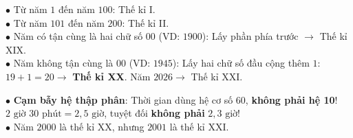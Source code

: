 \documentclass[14pt,a4paper,oneside]{extbook}
\begin{document}
\noindent
\begin{minipage}[t]{0.54\textwidth}
  \begin{tcolorbox}[
    enhanced,
    title={\footnotesize\bfseries\color{white}\faHistory\ Cách xác định năm thuộc thế kỉ nào},
    colback=green!3!white,
    colframe=green!60!black,
    arc=2.5mm, boxrule=0.8pt, top=1.8mm, bottom=1.8mm, left=2.2mm, right=2.2mm
  ]
    \footnotesize
    $\bullet$ Từ năm $1$ đến năm $100$: Thế kỉ I.\\
    $\bullet$ Từ năm $101$ đến năm $200$: Thế kỉ II.\\
    $\bullet$ Năm có tận cùng là hai chữ số $00$ (VD: $1900$): Lấy phần phía trước $\rightarrow$ Thế kỉ XIX.\\
    $\bullet$ Năm không tận cùng là $00$ (VD: $1945$): Lấy hai chữ số đầu cộng thêm $1$: $19 + 1 = 20 \rightarrow$ \textbf{Thế kỉ XX}. Năm $2026 \rightarrow$ Thế kỉ XXI.
  \end{tcolorbox}
\end{minipage}%
\hfill
\begin{minipage}[t]{0.44\textwidth}
  \begin{tcolorbox}[
    enhanced,
    title={\footnotesize\bfseries\color{white}\faExclamationTriangle\ Mẹo tránh bẫy trắc nghiệm},
    colback=red!2!white,
    colframe=red!70!black,
    arc=2.5mm, boxrule=0.8pt, top=1.8mm, bottom=1.8mm, left=2.2mm, right=2.2mm
  ]
    \footnotesize
    $\bullet$ \textbf{Cạm bẫy hệ thập phân}: Thời gian dùng hệ cơ số $60$, \textbf{không phải hệ 10}!\\
    $2\text{ giờ } 30\text{ phút} = 2,5\text{ giờ}$, tuyệt đối \textbf{không phải} $2,3\text{ giờ}$!\\
    $\bullet$ Năm $2000$ là thế kỉ XX, nhưng $2001$ là thế kỉ XXI.
  \end{tcolorbox}
\end{minipage}
\end{document}
